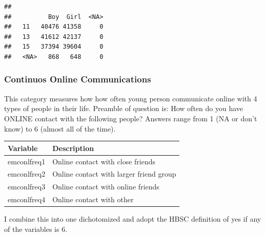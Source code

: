 \documentclass[
]{article}
\newenvironment{Shaded}{\begin{snugshade}}{\end{snugshade}}
\newcommand{\AttributeTok}[1]{\textcolor[rgb]{0.13,0.29,0.53}{#1}}
\newcommand{\FunctionTok}[1]{\textcolor[rgb]{0.13,0.29,0.53}{\textbf{#1}}}
\newcommand{\NormalTok}[1]{#1}
\newcommand{\SpecialCharTok}[1]{\textcolor[rgb]{0.81,0.36,0.00}{\textbf{#1}}}
\newcommand{\StringTok}[1]{\textcolor[rgb]{0.31,0.60,0.02}{#1}}
\begin{document}
\begin{Shaded}
\end{Shaded}

\begin{verbatim}
##       
##          Boy  Girl  <NA>
##   11   40476 41358     0
##   13   41612 42137     0
##   15   37394 39604     0
##   <NA>   868   648     0
\end{verbatim}

\subsubsection{Continuos Online
Communications}\label{continuos-online-communications}

This category measures how how often young person communicate online
with 4 types of people in their life. Preamble of question is: How often
do you have ONLINE contact with the following people? Answers range from
1 (NA or don't know) to 6 (almost all of the time).

\begin{longtable}[]{@{}ll@{}}
\toprule\noalign{}
Variable & Description \\
\midrule\noalign{}
\endhead
\bottomrule\noalign{}
\endlastfoot
emconlfreq1 & Online contact with close friends \\
emconlfreq2 & Online contact with larger friend group \\
emconlfreq3 & Online contact with online friends \\
emconlfreq4 & Online contact with other \\
\end{longtable}

I combine this into one dichotomized and adopt the HBSC definition of
yes if any of the variables is 6.
\end{document}

